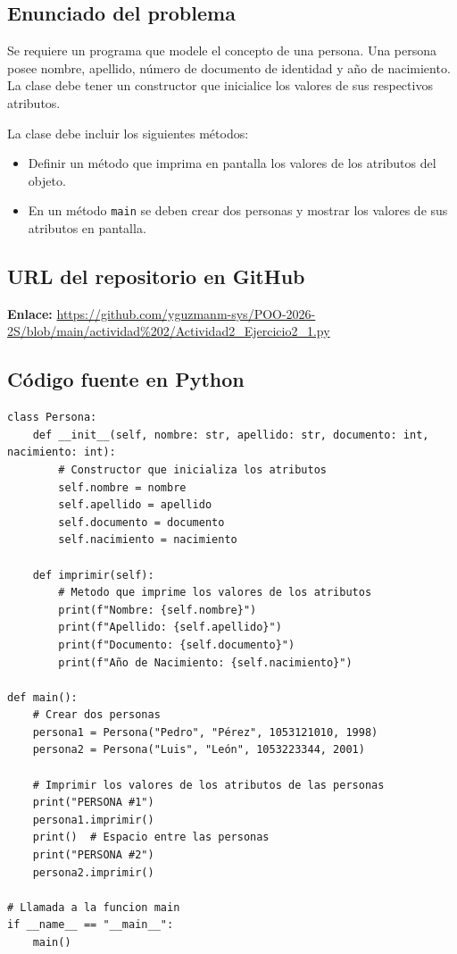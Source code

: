 \documentclass[11pt,a4paper]{article}
\begin{document}
\subsection{Enunciado del problema}
Se requiere un programa que modele el concepto de una persona. Una persona posee nombre, apellido, número de documento de identidad y año de nacimiento. La clase debe tener un constructor que inicialice los valores de sus respectivos atributos.

La clase debe incluir los siguientes métodos:
\begin{itemize}
    \item Definir un método que imprima en pantalla los valores de los atributos del objeto.
    \item En un método \texttt{main} se deben crear dos personas y mostrar los valores de sus atributos en pantalla.
\end{itemize}

\subsection{URL del repositorio en GitHub}
\noindent \textbf{Enlace:} \url{https://github.com/yguzmanm-sys/POO-2026-2S/blob/main/actividad%202/Actividad2_Ejercicio2_1.py}

\subsection{Código fuente en Python}
\begin{lstlisting}[caption={Implementación de la clase Persona (\texttt{Actividad2\_Ejercicio2\_1.py})}]
class Persona:
    def __init__(self, nombre: str, apellido: str, documento: int, nacimiento: int):
        # Constructor que inicializa los atributos
        self.nombre = nombre
        self.apellido = apellido
        self.documento = documento
        self.nacimiento = nacimiento

    def imprimir(self):
        # Metodo que imprime los valores de los atributos
        print(f"Nombre: {self.nombre}")
        print(f"Apellido: {self.apellido}")
        print(f"Documento: {self.documento}")
        print(f"Año de Nacimiento: {self.nacimiento}")

def main():
    # Crear dos personas
    persona1 = Persona("Pedro", "Pérez", 1053121010, 1998)
    persona2 = Persona("Luis", "León", 1053223344, 2001)

    # Imprimir los valores de los atributos de las personas
    print("PERSONA #1")
    persona1.imprimir()
    print()  # Espacio entre las personas
    print("PERSONA #2")
    persona2.imprimir()

# Llamada a la funcion main
if __name__ == "__main__":
    main()
\end{lstlisting}
\end{document}
